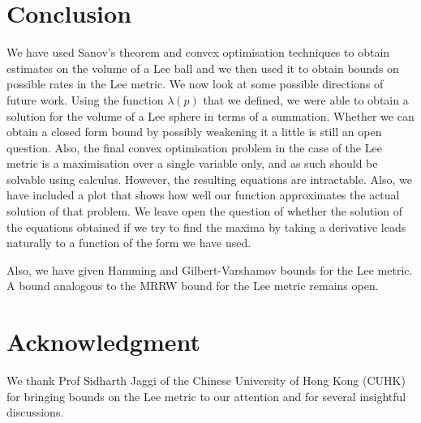 \documentclass[conference,letterpaper]{IEEEtran}
\begin{document}
\section{Conclusion}
We have used Sanov's theorem and convex optimisation techniques to obtain estimates on the volume of a Lee ball and we then used it to obtain bounds on possible rates in the Lee metric. We now look at some possible directions of future work. Using the function $\lambda(p)$ that we defined, we were able to obtain a solution for the volume of a Lee sphere in terms of a summation. Whether we can obtain a closed form bound by possibly weakening it a little is still an open question. Also, the final convex optimisation problem in the case of the Lee metric is a maximisation over a single variable only, and as such should be solvable using calculus. However, the resulting equations are intractable. Also, we have included a plot that shows how well our function approximates the actual solution of that problem. We leave open the question of whether the solution of the equations obtained if we try to find the maxima by taking a derivative leads naturally to a function of the form we have used. 

Also, we have given Hamming and Gilbert-Varshamov bounds for the Lee metric. A bound analogous to the MRRW bound for the Lee metric remains open.



\section*{Acknowledgment}
We thank Prof Sidharth Jaggi of the Chinese University of Hong Kong (CUHK) for bringing bounds on the Lee metric to our attention and for several insightful discussions.







\end{document}
